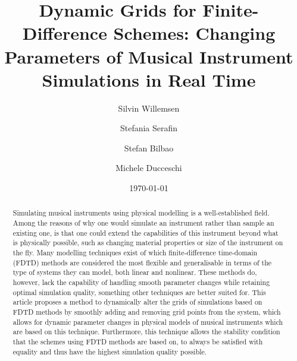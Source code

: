 \documentclass[dvipsnames, reprint]{JASA}
\begin{document}
\title[JASA/Dynamic Grids for Finite-Difference Schemes]{Dynamic Grids for Finite-Difference Schemes: Changing Parameters of Musical Instrument Simulations in Real Time}
\author{Silvin Willemsen}
\author{Stefania Serafin}

\author{Stefan Bilbao}
\author{Michele Ducceschi}
 



\date{\today} 

\begin{abstract}
Simulating musical instruments using physical modelling is a well-established field. Among the reasons of why one would simulate an instrument rather than sample an existing one, is that one could extend the capabilities of this instrument beyond what is physically possible, such as changing material properties or size of the instrument on the fly. Many modelling techniques exist of which finite-difference time-domain (FDTD) methods are considered the most flexible and generalisable in terms of the type of systems they can model, both linear and nonlinear. These methods do, however, lack the capability of handling smooth parameter changes while retaining optimal simulation quality, something other techniques are better suited for. This article proposes a method to dynamically alter the grids of simulations based on FDTD methods by smoothly adding and removing grid points from the system, which allows for dynamic parameter changes in physical models of musical instruments which are based on this technique. Furthermore, this technique allows the stability condition that the schemes using FDTD methods are based on, to always be satisfied with equality and thus have the highest simulation quality possible. 
\end{abstract}


\maketitle
\end{document}

